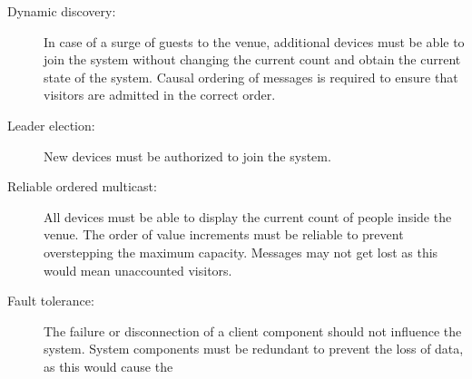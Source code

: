 \documentclass[runningheads]{llncs}
\begin{document}
\begin{description}
    \item [Dynamic discovery:] In case of a surge of guests to the venue, additional devices must be able to join the system without changing the current count and obtain the current state of the system. Causal ordering of messages is required to ensure that visitors are admitted in the correct order.
    \item [Leader election:] New devices must be authorized to join the system.
    \item [Reliable ordered multicast:] All devices must be able to display the current count of people inside the venue. The order of value increments must be reliable to prevent overstepping the maximum capacity. Messages may not get lost as this would mean unaccounted visitors.
    \item [Fault tolerance:] The failure or disconnection of a client component should not influence the system. System components must be redundant to prevent the loss of data, as this would cause the
    \end{description}
\end{document}
